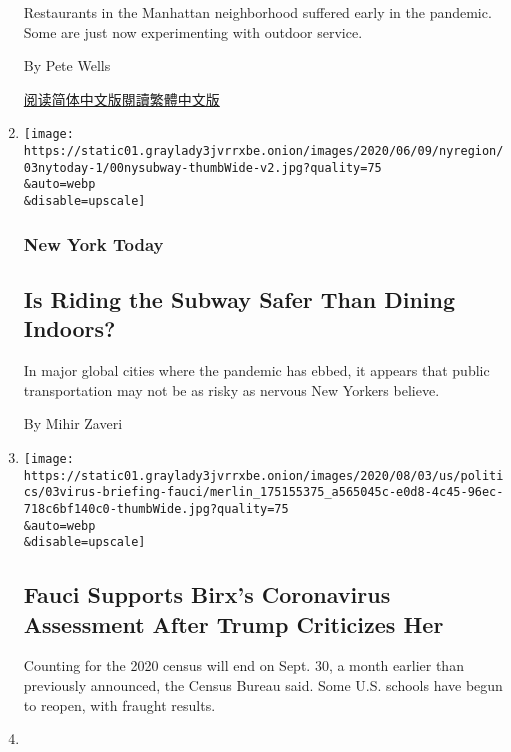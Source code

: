 \begin{enumerate}
  Restaurants in the Manhattan neighborhood suffered early in the
  pandemic. Some are just now experimenting with outdoor service.

  By Pete Wells

  \href{https://cn.nytimes3xbfgragh.onion/style/20200804/chinatown-outdoor-dining-coronavirus/}{阅读简体中文版}\href{https://cn.nytimes3xbfgragh.onion/style/20200804/chinatown-outdoor-dining-coronavirus/zh-hant/}{閱讀繁體中文版}
\item
  \href{/2020/08/03/nyregion/nyc-subway-coronavirus.html}{}

  \texttt{[image: https://static01.graylady3jvrrxbe.onion/images/2020/06/09/nyregion/03nytoday-1/00nysubway-thumbWide-v2.jpg?quality=75\\\&auto=webp\\\&disable=upscale]}

  \hypertarget{new-york-today-1}{%
  \subsubsection{New York Today}\label{new-york-today-1}}

  \hypertarget{is-riding-the-subway-safer-than-dining-indoors}{%
  \subsection{Is Riding the Subway Safer Than Dining
  Indoors?}\label{is-riding-the-subway-safer-than-dining-indoors}}

  In major global cities where the pandemic has ebbed, it appears that
  public transportation may not be as risky as nervous New Yorkers
  believe.

  By Mihir Zaveri
\item
  \href{/2020/08/03/world/coronavirus-covid-19.html}{}

  \texttt{[image: https://static01.graylady3jvrrxbe.onion/images/2020/08/03/us/politics/03virus-briefing-fauci/merlin\_175155375\_a565045c-e0d8-4c45-96ec-718c6bf140c0-thumbWide.jpg?quality=75\\\&auto=webp\\\&disable=upscale]}

  \hypertarget{fauci-supports-birxs-coronavirus-assessment-after-trump-criticizes-her}{%
  \subsection{Fauci Supports Birx's Coronavirus Assessment After Trump
  Criticizes
  Her}\label{fauci-supports-birxs-coronavirus-assessment-after-trump-criticizes-her}}

  Counting for the 2020 census will end on Sept. 30, a month earlier
  than previously announced, the Census Bureau said. Some U.S. schools
  have begun to reopen, with fraught results.
\item
  \href{/2020/08/03/nyregion/police-shea-de-blasio-nyc.html}{}


\end{enumerate}
